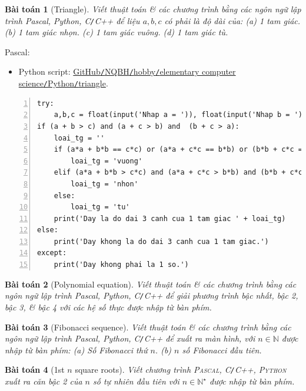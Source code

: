 \documentclass{article}
\newtheorem{baitoan}{Bài toán}
\begin{document}
\begin{baitoan}[Triangle]
	Viết thuật toán \& các chương trình bằng các ngôn ngữ lập trình {\sf Pascal, Python, C{\tt /}C++} để liệu $a,b,c$ có phải là độ dài của: (a) 1 tam giác. (b) 1 tam giác nhọn. (c) 1 tam giác vuông. (d) 1 tam giác tù.
\end{baitoan}
\noindent Pascal: 

\begin{itemize}
	\item Python script: \href{https://github.com/NQBH/hobby/blob/master/elementary_computer_science/Python/triangle.py}{GitHub{\tt /}NQBH{\tt /}hobby{\tt /}elementary computer science{\tt /}Python{\tt /}triangle}.
\end{itemize}

\begin{Verbatim}[numbers=left,xleftmargin=5mm]
try:
    a,b,c = float(input('Nhap a = ')), float(input('Nhap b = ')), float(input('Nhap c = '))
if (a + b > c) and (a + c > b) and  (b + c > a):
    loai_tg = ''
    if (a*a + b*b == c*c) or (a*a + c*c == b*b) or (b*b + c*c == a*a):
        loai_tg = 'vuong'
    elif (a*a + b*b > c*c) and (a*a + c*c > b*b) and (b*b + c*c > a*a):
        loai_tg = 'nhon'
    else:
        loai_tg = 'tu'
    print('Day la do dai 3 canh cua 1 tam giac ' + loai_tg)
else: 
    print('Day khong la do dai 3 canh cua 1 tam giac.')			
except:
    print('Day khong phai la 1 so.')
\end{Verbatim}

\begin{baitoan}[Polynomial equation]
	Viết thuật toán \& các chương trình bằng các ngôn ngữ lập trình {\sf Pascal, Python, C{\tt /}C++} để giải phương trình bậc nhất, bậc 2, bậc 3, \& bậc 4 với các hệ số thực được nhập từ bàn phím.
\end{baitoan}

\begin{baitoan}[Fibonacci sequence]
	Viết thuật toán \& các chương trình bằng các ngôn ngữ lập trình {\sf Pascal, Python, C{\tt /}C++} để xuất ra màn hình, với $n\in\mathbb{N}$ được nhập từ bàn phím: (a) Số Fibonacci thứ $n$. (b) $n$ số Fibonacci đầu tiên.
\end{baitoan}

\begin{baitoan}[1st $n$ square roots]
	Viết chương trình \textsc{Pascal, C{\tt /}C++, Python} xuất ra căn bậc 2 của $n$ số tự nhiên đầu tiên với $n\in\mathbb{N}^\star$ được nhập từ bàn phím.
\end{baitoan}
\end{document}
